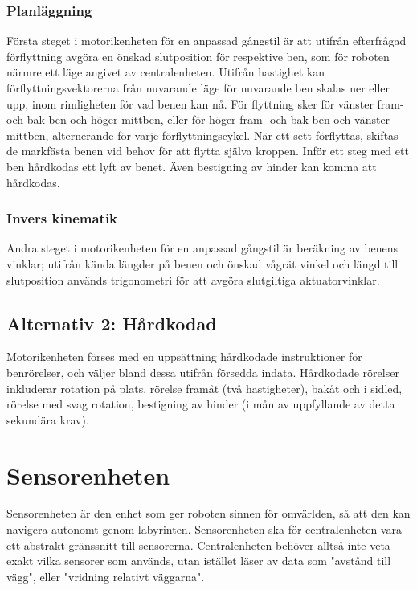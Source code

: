 \documentclass[a4paper,titlepage,12pt]{article}
\begin{document}
    	\subsubsection{Planläggning}
	Första steget i motorikenheten för en anpassad gångstil är att utifrån efterfrågad
    	förflyttning avgöra en önskad slutposition för respektive ben, som för roboten närmre 
    	ett läge angivet av centralenheten. Utifrån hastighet kan förflyttningsvektorerna 
    	från nuvarande läge för nuvarande ben skalas ner eller upp, inom rimligheten för vad
    	benen kan nå. För flyttning sker för vänster fram- och bak-ben och höger 
    	mittben, eller för höger fram- och bak-ben och vänster mittben, alternerande för varje
    	förflyttningscykel. När ett sett förflyttas, skiftas de markfästa benen vid behov för 
    	att flytta själva kroppen. Inför ett steg med ett ben hårdkodas ett lyft av benet. 
	Även bestigning av hinder kan komma att hårdkodas.
    
    	\subsubsection{Invers kinematik}
    	Andra steget i motorikenheten för en anpassad gångstil är beräkning av benens vinklar;
    	utifrån kända längder på benen  och önskad vågrät vinkel och längd till slutposition 
    	används trigonometri för att avgöra slutgiltiga aktuatorvinklar.
    
    	\subsection{Alternativ 2: Hårdkodad}
    	Motorikenheten förses med en uppsättning hårdkodade instruktioner för benrörelser, och
    	väljer bland dessa utifrån försedda indata. Hårdkodade rörelser inkluderar rotation på 
    	plats, rörelse framåt (två hastigheter), bakåt och i sidled, rörelse med svag rotation, 
    	bestigning av hinder (i mån av uppfyllande av detta sekundära krav). 
	
	\section{Sensorenheten}
    
    Sensorenheten är den enhet som ger roboten sinnen för omvärlden, så att den
    kan navigera autonomt genom labyrinten. Sensorenheten ska för
    centralenheten vara ett abstrakt gränssnitt till sensorerna. Centralenheten
    behöver alltså inte veta exakt vilka sensorer som används, utan istället
    läser av data som "avstånd till vägg", eller "vridning relativt väggarna".
\end{document}
